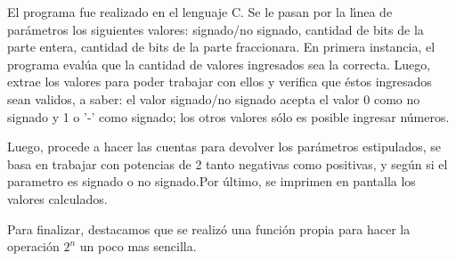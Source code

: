 \documentclass[english]{article}
\begin{document}
El programa fue realizado en el lenguaje C. Se le pasan por la l\'{\i}nea
de par\'{a}metros los siguientes valores: signado/no signado, cantidad
de bits de la parte entera, cantidad de bits de la parte fraccionara.
En primera instancia, el programa eval\'{u}a que la cantidad de valores
ingresados sea la correcta. Luego, extrae los valores para poder trabajar
con ellos y verifica que \'{e}stos ingresados sean validos, a saber:
el valor signado/no signado acepta el valor 0 como no signado y 1
o '-' como signado; los otros valores s\'{o}lo es posible ingresar
n\'{u}meros.

Luego, procede a hacer las cuentas para devolver los par\'{a}metros
estipulados, se basa en trabajar con potencias de 2 tanto negativas
como positivas, y seg\'{u}n si el parametro es signado o no signado.Por
\'{u}ltimo, se imprimen en pantalla los valores calculados.

Para finalizar, destacamos que se realiz\'{o} una funci\'{o}n propia para hacer la operaci\'{o}n
$2^{n}$ un poco mas sencilla.
\end{document}
